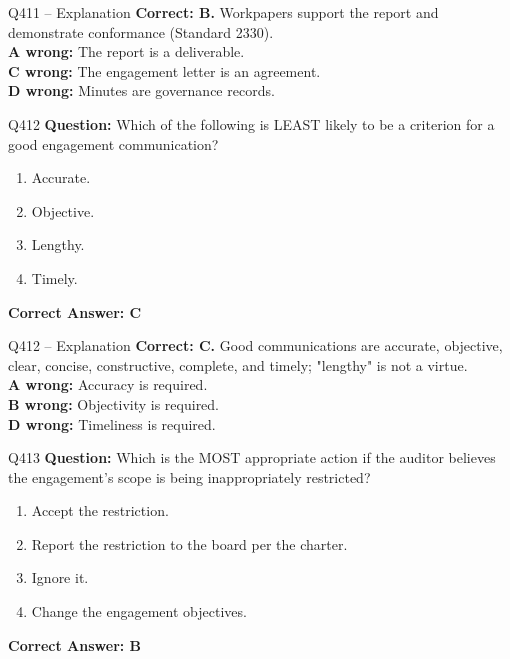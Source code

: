 \documentclass[aspectratio=169,10pt]{beamer}
\begin{document}
	\begin{frame}[t]{Q411 -- Explanation}
		\small
		\textbf{Correct: B.} Workpapers support the report and demonstrate conformance (Standard 2330). \\[4pt]
		\textbf{A wrong:} The report is a deliverable. \\[2pt]
		\textbf{C wrong:} The engagement letter is an agreement. \\[2pt]
		\textbf{D wrong:} Minutes are governance records.
	\end{frame}
	
	\begin{frame}[t]{Q412}
		\small
		\textbf{Question:} Which of the following is LEAST likely to be a criterion for a good engagement communication?
		\begin{enumerate}[label=\Alph*.,itemsep=1pt,topsep=2pt]
			\item Accurate.
			\item Objective.
			\item Lengthy.
			\item Timely.
		\end{enumerate}
		\vspace{4pt}
		\textbf{Correct Answer: C}
	\end{frame}
	
	\begin{frame}[t]{Q412 -- Explanation}
		\small
		\textbf{Correct: C.} Good communications are accurate, objective, clear, concise, constructive, complete, and timely; "lengthy" is not a virtue. \\[4pt]
		\textbf{A wrong:} Accuracy is required. \\[2pt]
		\textbf{B wrong:} Objectivity is required. \\[2pt]
		\textbf{D wrong:} Timeliness is required.
	\end{frame}
	
	\begin{frame}[t]{Q413}
		\small
		\textbf{Question:} Which is the MOST appropriate action if the auditor believes the engagement's scope is being inappropriately restricted?
		\begin{enumerate}[label=\Alph*.,itemsep=1pt,topsep=2pt]
			\item Accept the restriction.
			\item Report the restriction to the board per the charter.
			\item Ignore it.
			\item Change the engagement objectives.
		\end{enumerate}
		\vspace{4pt}
		\textbf{Correct Answer: B}
	\end{frame}
	
\end{document}
